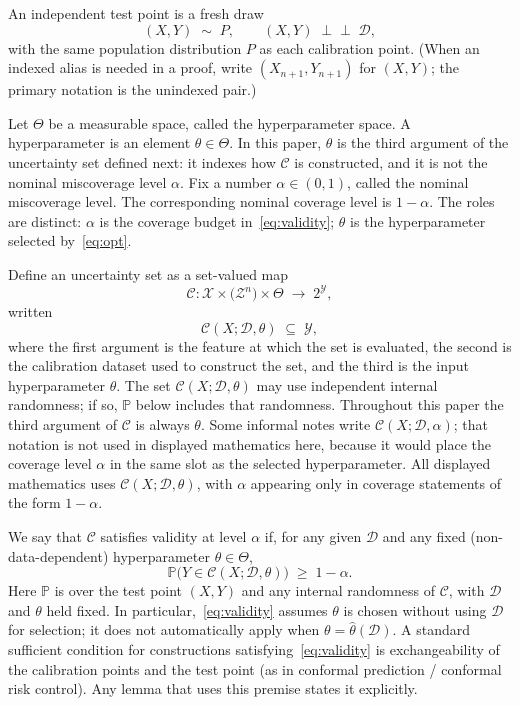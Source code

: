 \documentclass[12pt]{article}
\theoremstyle{plain}
\begin{document}
\label{def:test}
An independent test point is a fresh draw
\[
(X,Y)\;\sim\; P,
\qquad
(X,Y)\;\perp\!\!\!\perp\;\mathcal{D},
\]
with the same population distribution $P$ as each calibration point.
(When an indexed alias is needed in a proof, write $(X_{n+1},Y_{n+1})$ for $(X,Y)$; the primary notation is the unindexed pair.)

\label{def:theta}
Let $\Theta$ be a measurable space, called the hyperparameter space.
A hyperparameter is an element $\theta\in\Theta$.
In this paper, $\theta$ is the third argument of the uncertainty set defined next: it indexes how $\mathcal{C}$ is constructed, and it is not the nominal miscoverage level $\alpha$.
\label{def:alpha}
Fix a number $\alpha\in(0,1)$, called the nominal miscoverage level.
The corresponding nominal coverage level is $1-\alpha$.
The roles are distinct: $\alpha$ is the coverage budget in~\eqref{eq:validity}; $\theta$ is the hyperparameter selected by~\eqref{eq:opt}.

\label{def:C}
Define an uncertainty set as a set-valued map
\[
\mathcal{C}
:
\mathcal{X}\times\bigl(\mathcal{Z}^n\bigr)\times\Theta
\;\longrightarrow\;
2^{\mathcal{Y}},
\]
written
\[
\mathcal{C}(X;\mathcal{D},\theta)
\;\subseteq\;
\mathcal{Y},
\]
where the first argument is the feature at which the set is evaluated, the second is the calibration dataset used to construct the set, and the third is the input hyperparameter $\theta$.
The set $\mathcal{C}(X;\mathcal{D},\theta)$ may use independent internal randomness; if so, $\mathbb{P}$ below includes that randomness.
\label{rem:C-arity}
Throughout this paper the third argument of $\mathcal{C}$ is always $\theta$.
Some informal notes write $\mathcal{C}(X;\mathcal{D},\alpha)$; that notation is not used in displayed mathematics here, because it would place the coverage level $\alpha$ in the same slot as the selected hyperparameter.
All displayed mathematics uses $\mathcal{C}(X;\mathcal{D},\theta)$, with $\alpha$ appearing only in coverage statements of the form $1-\alpha$.

\label{def:validity}
We say that $\mathcal{C}$ satisfies validity at level $\alpha$ if, for any given $\mathcal{D}$ and any fixed (non-data-dependent) hyperparameter $\theta\in\Theta$,
\begin{equation}
    \label{eq:validity}
    \mathbb{P}\bigl( Y \in \mathcal{C}(X;\mathcal{D},\theta) \bigr)
    \;\ge\;
    1-\alpha.
\end{equation}
Here $\mathbb{P}$ is over the test point $(X,Y)$ and any internal randomness of $\mathcal{C}$, with $\mathcal{D}$ and $\theta$ held fixed.
In particular,~\eqref{eq:validity} assumes $\theta$ is chosen without using $\mathcal{D}$ for selection; it does not automatically apply when $\theta=\hat\theta(\mathcal{D})$.
\label{rem:exchangeability}
A standard sufficient condition for constructions satisfying~\eqref{eq:validity} is exchangeability of the calibration points and the test point (as in conformal prediction / conformal risk control).
Any lemma that uses this premise states it explicitly.
\end{document}
